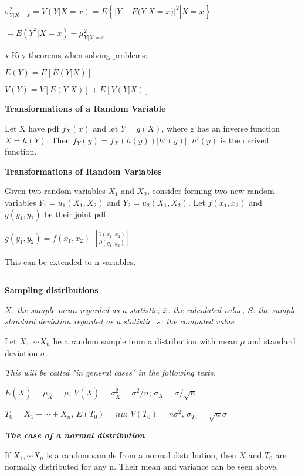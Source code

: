 \documentclass{article}
\newcommand{\sectionline}{\color{black}\rule[2pt]{0.45\textwidth}{0.05em}\color{black}}
\newcommand{\bigtitle}[1]{
	\noindent
	\textbf{#1}
}
\newcommand{\smalltitle}[1]{
	\noindent
	\textbf{\textit{#1}}
}
\begin{document}
	$\sigma^2_{Y|X=x} = V(Y|X=x) = E\left\lbrace[Y-E(Y|X=x)]^2|X=x\right\rbrace$
	
	$=E(Y^2|X=x)-\mu^2_{Y|X=x}$
	
	\noindent
	$\star$ Key theorems when solving problems:
	
	$E(Y) = E[E(Y|X)]$
	
	$V(Y) = V[E(Y|X)]+E[V(Y|X)]$
	
	
	
	
	
	\bigtitle{Transformations of a Random Variable}
	
	Let X have pdf $f_X(x)$ and let $Y = g(X)$, where g has an inverse function $X = h(Y)$.
	Then $f_Y(y) = f_X(h(y)) \left|h'(y)\right|$. $h'(y)$ is the derived function.
	
	\bigtitle{Transformations of Random Variables}
	
	Given two random variables $X_1$ and $X_2$, consider forming two new random variables $Y_1 = u_1(X_1, X_2)$ and $Y_2 = u_2(X_1, X_2)$.
	Let $f(x_1,x_2)$ and $g(y_1,y_2)$ be their joint pdf.
	
	$g(y_1,y_2) = f(x_1,x_2)\cdot \left|\frac{\partial(x_1,x_2)}{\partial(y_1,y_2)}\right|$
	
	This can be extended to n variables.
	
	\sectionline
	
	
	
	\bigtitle{Sampling distributions}
	
	\textit{$\overline{X}$: the sample mean regarded as a statistic, $\overline{x}$: the calculated value, $S$: the sample standard deviation regarded as a statistic, $s$: the computed value}
	
	Let $X_1,\cdots X_n$ be a random sample from a distribution with mean $\mu$ and standard deviation $\sigma$.
	
	\textit{This will be called "in general cases" in the following texts.}
	
	$E(\overline{X}) = \mu_{\overline{X}} = \mu$; 
	$V(\overline{X}) = \sigma^2_{\overline{X}} = \sigma^2/n$; 
	$\sigma_{\overline{X}} = \sigma/\sqrt{n}$
	
	$T_0 = X_1 + \cdots + X_n$,
	$E(T_0) = n\mu$; 
	$V(T_0) = n\sigma^2$, $\sigma_{T_0} = \sqrt{n}\sigma $
	
	\smalltitle{The case of a normal distribution}
	
	If $X_1,\cdots X_n$ is a random sample from a normal distribution, then $\overline{X}$ and $T_0$ are normally distributed for any n. Their mean and variance can be seen above.
	
\end{document}
